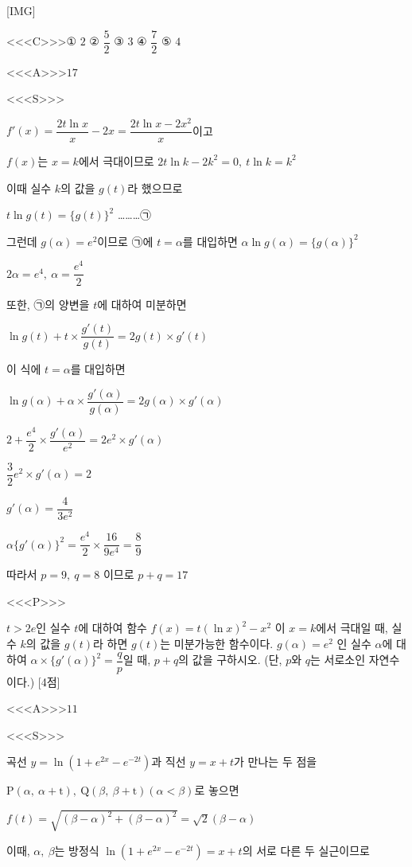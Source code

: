 \documentclass{oblivoir}
\begin{document}
[IMG]

<<<C>>>① $2$ ② $\dfrac{5}{2}$ ③ $3$  ④ $\dfrac{7}{2}$ ⑤ $4$

<<<A>>>$17$

<<<S>>>

$f'(x)=\dfrac{2t\ln x}{x}-2x=\dfrac{2t\ln x-2x^{2}}{x}$이고 

$f(x)$는 $x=k$에서 극대이므로 $2t\ln k-2k^{2}=0,\:t\ln k=k^{2}$

이때 실수 $k$의 값을 $g(t)$라 했으므로 

$t\ln g(t)=\{g(t)\}^{2}$   ………㉠

그런데  $g(\alpha)=e^{2}$이므로 ㉠에 $t=\alpha$를 대입하면 $\alpha\ln g(\alpha)=\{g(\alpha)\}^{2}$

$2\alpha =e^{4},\:\alpha =\dfrac{e^{4}}{2}$

또한, ㉠의 양변을 $t$에 대하여 미분하면

$\ln g(t)+t\times\dfrac{g'(t)}{g(t)}=2 g(t)\times g'(t)$

이 식에 $t=\alpha$를 대입하면

$\ln g(\alpha)+\alpha\times\dfrac{g'(\alpha)}{g(\alpha)}=2 g(\alpha)\times g'(\alpha)$

$2+\dfrac{e^{4}}{2}\times\dfrac{g'(\alpha)}{e^{2}}=2 e^{2}\times g'(\alpha)$

$\dfrac{3}{2}e^{2}\times g'(\alpha)=2$

$g'(\alpha)=\dfrac{4}{3e^{2}}$

$\alpha\{g'(\alpha)\}^{2}=\dfrac{e^{4}}{2}\times\dfrac{16}{9e^{4}}=\dfrac{8}{9}$

따라서 $p=9,\:q=8$ 이므로 $p+q=17$

<<<P>>>

$t >2e$인 실수 $t$에 대하여 함수 $f(x)=t(\ln x)^{2}-x^{2}$ 이 $x=k$에서 극대일 때, 실수 $k$의 값을 $g(t)$라 하면 $g(t)$는 미분가능한 함수이다. $g(\alpha)=e^{2}$ 인 실수 $\alpha$에 대하여  $\alpha\times\{g'(\alpha)\}^{2}=\dfrac{q}{p}$일 때, $p+q$의 값을 구하시오. (단, $p$와 $q$는 서로소인 자연수이다.) [4점]

<<<A>>>$11$

<<<S>>>

곡선 $y=\ln(1+e^{2x}-e^{-2t})$과 직선 $y=x+t$가 만나는 두 점을 

$\mathrm{P}(\alpha ,\:\alpha +\mathrm{t}),\:\mathrm{Q}(\beta ,\:\beta +\mathrm{t})(\alpha < \beta)$로 놓으면

$f(t)=\sqrt{(\beta -\alpha)^{2}+(\beta -\alpha)^{2}}=\sqrt{2}(\beta -\alpha)$

이때, $\alpha ,\:\beta$는 방정식 $\ln(1+e^{2x}-e^{-2t})=x+t$의 서로 다른 두 실근이므로
\end{document}
